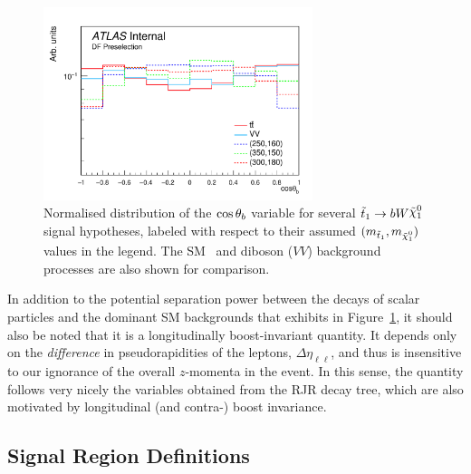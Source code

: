 \begin{figure}[!htb]
    \begin{center}
        \includegraphics[width=0.7\textwidth]{figures/search_stop2l/strategy/comp_plots/dfpresel_cosThetaB}
        \caption{
            Normalised distribution of the $\cos\theta_b$ variable for several $\stopone \rightarrow b W \ninoone$
            signal hypotheses, labeled with respect to their assumed $(m_{\stopone}, m_{\ninoone})$ values in the
            legend.
            The SM \ttbar~and diboson ($VV$) background processes are also shown for comparison.
        }
        \label{fig:rjr_cosb}
    \end{center}
\end{figure}

In addition to the potential separation power between the decays of scalar \stopone particles
and the dominant SM backgrounds that \cosb exhibits in Figure~\ref{fig:rjr_cosb}, it should also
be noted that it is a longitudinally boost-invariant quantity.
It depends only on the \textit{difference} in pseudorapidities of the leptons, $\Delta \eta_{\ell\ell}$,
and thus is insensitive to our ignorance of the overall $z$-momenta in the event.
In this sense, the quantity \cosb follows very nicely the variables obtained from the RJR decay tree,
which are also motivated by longitudinal (and contra-) boost invariance.

\FloatBarrier
%
%
\subsection{Signal Region Definitions}
\label{sec:stop_signal_region}


